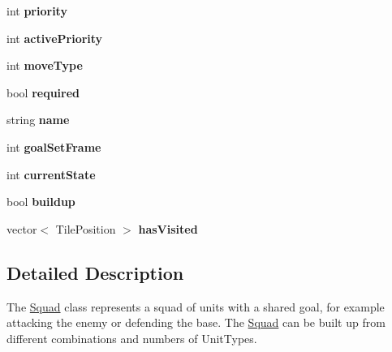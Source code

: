 \begin{DoxyCompactItemize}
\item 
\hypertarget{class_squad_a15463a14e1cfdc9fccf66fcce5cc2ab5}{int {\bfseries priority}}\label{class_squad_a15463a14e1cfdc9fccf66fcce5cc2ab5}

\item 
\hypertarget{class_squad_afa6fea799704afd5711471f270ab0eca}{int {\bfseries active\-Priority}}\label{class_squad_afa6fea799704afd5711471f270ab0eca}

\item 
\hypertarget{class_squad_a70dd0084e84cf622259419938e082949}{int {\bfseries move\-Type}}\label{class_squad_a70dd0084e84cf622259419938e082949}

\item 
\hypertarget{class_squad_aa6fdf236dda86d6bd92adfb7abeb255d}{bool {\bfseries required}}\label{class_squad_aa6fdf236dda86d6bd92adfb7abeb255d}

\item 
\hypertarget{class_squad_ae3d5b276575fecd105377e423a7a7d62}{string {\bfseries name}}\label{class_squad_ae3d5b276575fecd105377e423a7a7d62}

\item 
\hypertarget{class_squad_aab4c1cafc7148c4b4b5b4ad456f1bebf}{int {\bfseries goal\-Set\-Frame}}\label{class_squad_aab4c1cafc7148c4b4b5b4ad456f1bebf}

\item 
\hypertarget{class_squad_a463f62b902f0a9f02f6928b58d70dc78}{int {\bfseries current\-State}}\label{class_squad_a463f62b902f0a9f02f6928b58d70dc78}

\item 
\hypertarget{class_squad_acad67ae0940d5d450516f5974cb3c18d}{bool {\bfseries buildup}}\label{class_squad_acad67ae0940d5d450516f5974cb3c18d}

\item 
\hypertarget{class_squad_a5b880c5860899902db2643c3771aabe7}{vector$<$ Tile\-Position $>$ {\bfseries has\-Visited}}\label{class_squad_a5b880c5860899902db2643c3771aabe7}

\end{DoxyCompactItemize}


\subsection{Detailed Description}
The \hyperlink{class_squad}{Squad} class represents a squad of units with a shared goal, for example attacking the enemy or defending the base. The \hyperlink{class_squad}{Squad} can be built up from different combinations and numbers of Unit\-Types.

